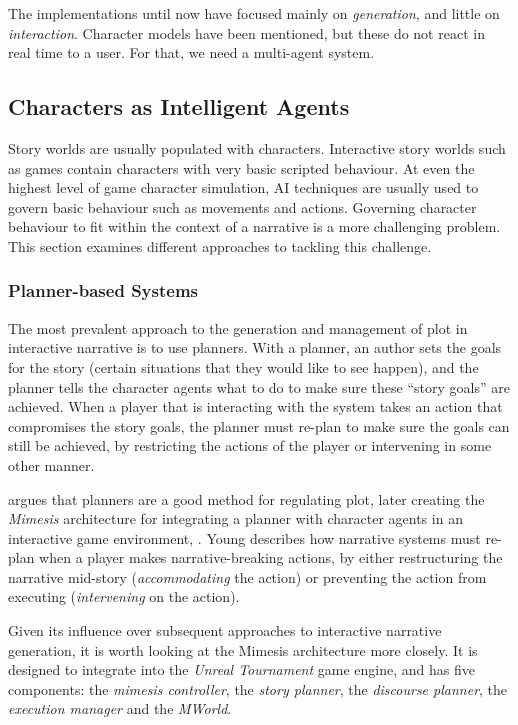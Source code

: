 \documentclass[11pt]{report}
\begin{document}
The implementations until now have focused mainly on \emph{generation\/}, and little on \emph{interaction\/}. Character models have been mentioned, but these do not react in real time to a user. For that, we need a multi-agent system.

\subsection{Characters as Intelligent Agents}
Story worlds are usually populated with characters. Interactive story worlds
such as games contain characters with very basic scripted behaviour. At even the
highest level of game character simulation, AI techniques are usually used to
govern basic behaviour such as movements and actions. Governing character
behaviour to fit within the context of a narrative is a more challenging
problem. This section examines different approaches to tackling this challenge.

\subsubsection{Planner-based Systems}
The most prevalent approach to the generation and management of plot in
interactive narrative is to use planners. With a planner, an author sets the
goals for the story (certain situations that they would like to see happen), and
the planner tells the character agents what to do to make sure these ``story
goals'' are achieved. When a player that is interacting with the system takes an
action that compromises the story goals, the planner must re-plan to make sure
the goals can still be achieved, by restricting the actions of the player or
intervening in some other manner.

\citet{young1999notes} argues that planners are a good method for regulating
plot, later creating the \emph{Mimesis} architecture for integrating a planner with character agents in an interactive game environment, \citep{young2004architecture}. Young describes how narrative systems must re-plan when a player makes  narrative-breaking actions, by either restructuring the narrative mid-story (\emph{accommodating} the action) or preventing the action from executing (\emph{intervening} on the action).

Given its influence over subsequent approaches to interactive narrative
generation, it is worth looking at the Mimesis architecture more closely.
It is designed to integrate into the \emph{Unreal
  Tournament} game engine, and has five components: the \emph{mimesis
  controller}, the \emph{story planner}, the \emph{discourse planner}, the
\emph{execution manager} and the \emph{MWorld}.
\end{document}
